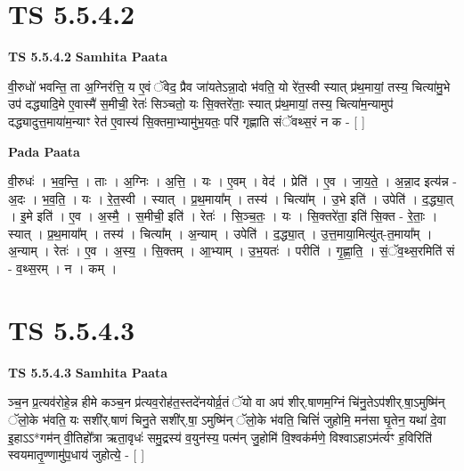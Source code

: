\documentclass[17pt]{extarticle}
\begin{document}
\section*{ TS 5.5.4.2 }

\textbf{TS 5.5.4.2 } \newline
\textbf{Samhita Paata} \newline

वी॒रुधो॑ भवन्ति॒ ता अ॒ग्निर॑त्ति॒ य ए॒वं ॅवेद॒ प्रैव जा॑यतेऽन्ना॒दो भ॑वति॒ यो रे॑त॒स्वी स्यात् प्र॑थ॒मायां॒ तस्य॒ चित्या॑मु॒भे उप॑ दद्ध्यादि॒मे ए॒वास्मै॑ स॒मीची॒ रेतः॑ सिञ्चतो॒ यः सि॒क्तरे॑ताः॒ स्यात् प्र॑थ॒मायां॒ तस्य॒ चित्या॑म॒न्यामुप॑ दद्ध्यादुत्त॒माया॑म॒न्याꣳ रेत॑ ए॒वास्य॑ सि॒क्तमा॒भ्यामु॑भ॒यतः॒ परि॑ गृह्णाति संॅवथ्स॒रं न क - [  ] \newline

\textbf{Pada Paata} \newline

वी॒रुधः॑ । भ॒व॒न्ति॒ । ताः । अ॒ग्निः । अ॒त्ति॒ । यः । ए॒वम् । वेद॑ । प्रेति॑ । ए॒व । जा॒य॒ते॒ । अ॒न्ना॒द इत्य॑न्न - अ॒दः । भ॒व॒ति॒ । यः । रे॒त॒स्वी । स्यात् । प्र॒थ॒माया᳚म् । तस्य॑ । चित्या᳚म् । उ॒भे इति॑ । उपेति॑ । द॒द्ध्या॒त् । इ॒मे इति॑ । ए॒व । अ॒स्मै॒ । स॒मीची॒ इति॑ । रेतः॑ । सि॒ञ्च॒तः॒ । यः । सि॒क्तरे॑ता॒ इति॑ सि॒क्त - रे॒ताः॒ । स्यात् । प्र॒थ॒माया᳚म् । तस्य॑ । चित्या᳚म् । अ॒न्याम् । उपेति॑ । द॒द्ध्या॒त् । उ॒त्त॒माया॒मित्यु॑त्-त॒माया᳚म् । अ॒न्याम् । रेतः॑ । ए॒व । अ॒स्य॒ । सि॒क्तम् । आ॒भ्याम् । उ॒भ॒यतः॑ । परीति॑ । गृ॒ह्णा॒ति॒ । सं॒ॅव॒थ्स॒रमिति॑ सं - व॒थ्स॒रम् । न । कम् ।  \newline




\section*{ TS 5.5.4.3 }

\textbf{TS 5.5.4.3 } \newline
\textbf{Samhita Paata} \newline

ञ्च॒न प्र॒त्यव॑रोहे॒न्न हीमे कञ्च॒न प्र॑त्यव॒रोह॑त॒स्तदे॑नयोर्व्र॒तं ॅयो वा अप॑ शीर्.षाणम॒ग्निं चि॑नु॒तेऽप॑शीर्.षा॒ऽमुष्मि॑न् ॅलो॒के भ॑वति॒ यः सशी॑र्.षाणं चिनु॒ते सशी॑र्.षा॒ ऽमुष्मि॑न् ॅलो॒के भ॑वति॒ चित्तिं॑ जुहोमि॒ मन॑सा घृ॒तेन॒ यथा॑ दे॒वा इ॒हाऽऽ*गम॑न् वी॒तिहो᳚त्रा ऋता॒वृधः॑ समु॒द्रस्य॑ व॒युन॑स्य॒ पत्म॑न् जु॒होमि॑ वि॒श्वक॑र्मणे॒ विश्वाऽहाऽम॑र्त्यꣳ ह॒विरिति॑ स्वयमातृ॒ण्णामु॑प॒धाय॑ जुहोत्ये॒ - [  ] \newline
\end{document}
